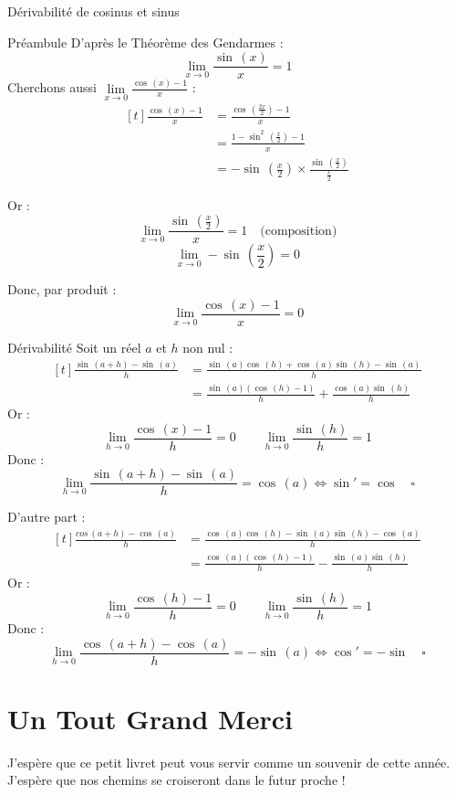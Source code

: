 \documentclass{coursbook}
\begin{document}
\begin{Gpartie}{Dérivabilité de cosinus et sinus}
\begin{Spartie}{Préambule}
            D'après le Théorème des Gendarmes : \[\lim\limits_{x\to0}\frac{\sin\,(x)}{x}=1\]
            \vspace{2ex}
            Cherchons aussi \quad $\lim\limits_{x\to0}\frac{\cos\,(x)-1}{x}$ : 
            \[\begin{aligned}[t]
                \frac{\cos\,(x)-1}{x} &= \frac{\cos\,\left(\frac{2x}{2}\right)-1}{x} \\
                &= \frac{1-\sin^2\,\left(\frac{x}{2}\right)-1}{x} \\
                &= -\sin\,\left(\frac{x}{2}\right)\times\frac{\sin\,\left(\frac{x}{2}\right)}{\frac{x}{2}}
            \end{aligned}\]
            
            Or :  \[\lim\limits_{x\to0}\dfrac{\sin\,\left(\frac{x}{2}\right)}{x}=1\quad\text{(composition)}\] \[\lim\limits_{x\to0}-\sin\,\left(\frac{x}{2}\right)=0\]

            Donc, par produit : \[\lim\limits_{x\to0}\dfrac{\cos\,(x)-1}{x}=0\]
        \end{Spartie}
        \begin{Spartie}{Dérivabilité} 
            Soit un réel $a$ et $h$ non nul : 
            \[\begin{aligned}[t]
                \frac{\sin\,(a+h)-\sin\,(a)}{h} &= \frac{\sin\,(a)\cos\,(h)+\cos\,(a)\sin\,(h)-\sin\,(a)}{h} \\
                &= \frac{\sin\,(a)\left(\cos\,(h)-1\right)}{h}+\frac{\cos\,(a)\sin\,(h)}{h}
            \end{aligned}\]
            Or : \[\lim\limits_{h\to0}\frac{\cos\,(x)-1}{h}=0\qquad\lim\limits_{h\to0}\frac{\sin\,(h)}{h}=1\]
            Donc : \[\lim\limits_{h\to0}\frac{\sin\,(a+h)-\sin\,(a)}{h}=\cos\,(a)\iff\sin'=\cos\quad\square\]

            D'autre part : 
            \[\begin{aligned}[t]
                \frac{cos\,(a+h)-\cos\,(a)}{h} &= \frac{\cos\,(a)\cos\,(h)-\sin\,(a)\sin\,(h)-\cos\,(a)}{h} \\
                &= \frac{\cos\,(a)(\cos\,(h)-1)}{h}-\frac{\sin\,(a)\sin\,(h)}{h}
            \end{aligned}\]
            Or : \[\lim\limits_{h\to0}\frac{\cos\,(h)-1}{h}=0\qquad\lim\limits_{h\to0}\frac{\sin\,(h)}{h}=1\]
            Donc : \[\lim\limits_{h\to0}\frac{\cos\,(a+h)-\cos\,(a)}{h}=-\sin\,(a)\iff\cos'=-\sin\quad\square\]

        \end{Spartie}
    \end{Gpartie}
	
	\chapter{Un Tout Grand Merci}
	J'espère que ce petit livret peut vous servir comme un souvenir de cette année. J'espère que nos chemins se croiseront dans le futur proche !
\end{document}
